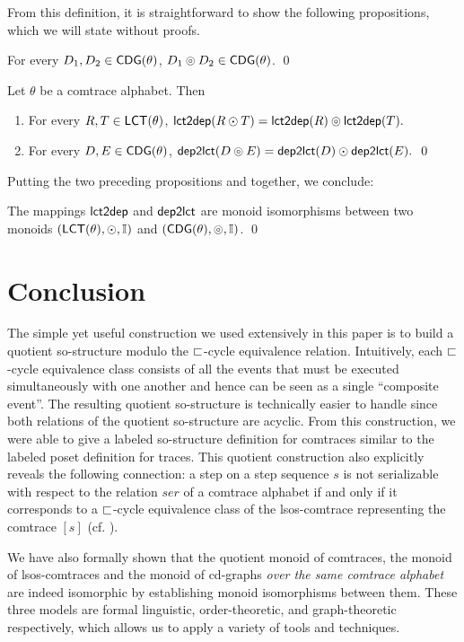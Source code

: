 \documentclass{llncs}
\begin{document}
From this definition, it is straightforward to show the following propositions, which we will state without proofs.

\begin{proposition}
For every $D_1,D_2\in \mathsf{CDG}(\theta)$, $D_1\circledcirc D_2 \in \mathsf{CDG}(\theta)$. \qed 
\end{proposition}

\begin{proposition}  Let $\theta$ be a comtrace alphabet. Then  
\begin{enumerate}
\item For every $R,T \in \mathsf{LCT}(\theta)$, $\mathsf{lct2dep}(R \odot T) = \mathsf{lct2dep}(R) \circledcirc \mathsf{lct2dep}(T).$
\item For every $D,E \in \mathsf{CDG}(\theta)$, $\mathsf{dep2lct}(D \circledcirc E) = \mathsf{dep2lct}(D) \odot \mathsf{dep2lct}(E).$ \qed
\end{enumerate}
\label{prop:hom2}
\end{proposition}

Putting the two preceding propositions  and  together, we conclude:
\begin{theorem}
The mappings $\mathsf{lct2dep}$ and $\mathsf{dep2lct}$ are monoid isomorphisms between two monoids $(\mathsf{LCT}(\theta),\odot, \mathbb{I})$ and $(\mathsf{CDG}(\theta),\circledcirc, \mathbb{I})$. \qed
\end{theorem}


\section{Conclusion}

The simple yet useful construction we used extensively in this paper is to build a quotient so-structure modulo the $\sqsubset$-cycle equivalence relation. Intuitively, each $\sqsubset$-cycle equivalence class consists of all the events that must be executed simultaneously with one another and hence can be seen as a single ``composite event''.  The resulting quotient so-structure  is technically  easier to handle since both relations of the quotient so-structure are acyclic. From this construction, we were able to give a labeled so-structure definition for comtraces similar to the labeled poset definition for traces. This quotient construction also explicitly  reveals the following connection: a step on a step sequence $s$ is not serializable with respect to  the relation $ser$ of a comtrace alphabet if and only if it corresponds to a $\sqsubset$-cycle equivalence class of the lsos-comtrace representing the comtrace $[s]$ (cf. ). 

We have also formally shown that the quotient monoid of comtraces, the monoid of lsos-comtraces and the monoid of cd-graphs \emph{over the same comtrace alphabet} are indeed isomorphic by establishing monoid isomorphisms between them. These three models are  formal linguistic,  order-theoretic, and  graph-theoretic respectively, which allows us to apply a variety of tools and techniques. 
\end{document}
